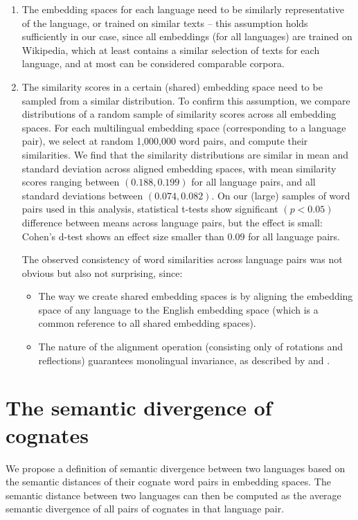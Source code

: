 \documentclass[output=paper]{langsci/langscibook}
\begin{document}
\begin{enumerate}
\item The embedding spaces for each language need to be similarly representative of the language, or trained on similar texts -- this assumption holds sufficiently in our case, since all embeddings (for all languages) are trained on Wikipedia, which at least contains a similar selection of texts for each language, and at most can be considered comparable corpora.

\item The similarity scores in a certain (shared) embedding space need to be sampled from a similar distribution. To confirm this assumption, we compare distributions of a random sample of similarity scores across all embedding spaces. For each multilingual embedding space (corresponding to a language pair), we select at random 1,000,000 word pairs, and compute their similarities. We find that the similarity distributions are similar in mean and standard deviation across aligned embedding spaces, with mean similarity scores ranging between $(0.188, 0.199)$ for all language pairs, and all standard deviations between $(0.074, 0.082)$. On our (large) samples of word pairs used in this analysis, statistical t-tests show significant $(p < 0.05)$ difference between means across language pairs, but the effect is small: Cohen's d-test shows an effect size smaller than $0.09$ for all language pairs.

The observed consistency of word similarities across language pairs was not obvious but also not surprising, since:
\begin{itemize}\sloppy
    \item The way we create shared embedding spaces is by aligning the embedding space of any language to the English embedding space (which is a common reference to all shared embedding spaces).
    \item The nature of the alignment operation (consisting only of rotations and reflections) guarantees monolingual invariance, as described by \citet{cognatesuban:artetxe2016learning} and \citet{align_4}.
\end{itemize}
\end{enumerate}


\section{The semantic divergence of cognates}
\label{section:semantic-divergence}

We propose a definition of semantic divergence between two languages based on the semantic distances of their cognate word pairs in embedding spaces. The semantic distance between two languages can then be computed as the average semantic divergence of all pairs of cognates in that language pair.
\end{document}
